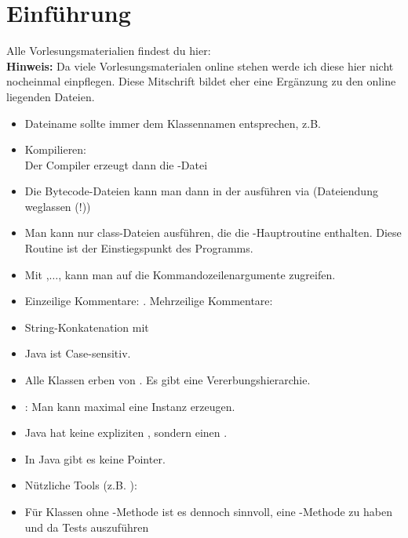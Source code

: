 
\chapter{Einführung}
Alle Vorlesungsmaterialien findest du hier:\\
\nl
\textbf{Hinweis:} Da viele Vorlesungsmaterialen online stehen werde ich diese hier nicht nocheinmal einpflegen.
Diese Mitschrift bildet eher eine Ergänzung zu den online liegenden Dateien.

\begin{itemize}
	\item Dateiname sollte immer dem Klassennamen entsprechen, z.B. 
	\item Kompilieren: \\
	Der Compiler erzeugt dann die -Datei 
	\item Die Bytecode-Dateien kann man dann in der  ausführen via  (Dateiendung weglassen (!))
	\item Man kann nur class-Dateien ausführen, die die -Hauptroutine enthalten.
	Diese Routine ist der Einstiegspunkt des Programms.
	\item Mit ,$\ldots$, kann man auf die Kommandozeilenargumente zugreifen.
	\item Einzeilige Kommentare: . Mehrzeilige Kommentare: \code{/*$\ldots$*/}
	\item String-Konkatenation mit \code{+}
	\item Java ist Case-sensitiv.
	\item Alle Klassen erben von . 
	Es gibt eine Vererbungshierarchie.
	\item {}: Man kann maximal eine Instanz erzeugen.
	\item Java hat keine expliziten , sondern einen .
	\item In Java gibt es keine Pointer.
	\item Nützliche Tools (z.B. ):
	\item Für Klassen ohne -Methode ist es dennoch sinnvoll, eine -Methode zu haben und da Tests auszuführen
\end{itemize}

